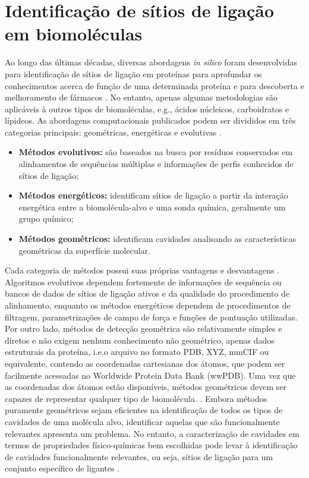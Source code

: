 \documentclass[Portugues]{phdquali}
\def\ie{i.e.\onedot}
\def\eg{e.g.\onedot}
\begin{document}
\section{Identificação de sítios de ligação em biomoléculas \label{sec:binding-sites}}

Ao longo das últimas décadas, diversas abordagens \textit{in silico} foram desenvolvidas para identificação de sítios de ligação em proteínas para aprofundar os conhecimentos acerca de função de uma determinada proteína e para descoberta e melhoramento de fármacos \cite{liang1998}. No entanto, apenas algumas metodologias são aplicáveis à outros tipos de biomoléculas, \eg, ácidos núcleicos, carboidratos e lípideos. As abordagens computacionais publicados podem ser divididos em três categorias principais: geométricas, energéticas e evolutivas \cite{oliveira2014,simoes2017}.

\begin{itemize}
  \item \textbf{Métodos evolutivos:} são baseados na busca por resíduos conservados em alinhamentos de sequências múltiplas e informações de perfis conhecidos de sítios de ligação;
  \item \textbf{Métodos energéticos:} identificam sítios de ligação a partir da interação energética entre a biomolécula-alvo e uma sonda química, geralmente um grupo químico;
  \item \textbf{Métodos geométricos:} identificam cavidades analisando as características geométricas da superfície molecular.
\end{itemize}

Cada categoria de métodos possui suas próprias vantagens e desvantagens \cite{sotriffer2002,henrich2010,simoes2017,krone2016}. Algoritmos evolutivos dependem fortemente de informações de sequência ou bancos de dados de sítios de ligação ativos e da qualidade do procedimento de alinhamento, enquanto os métodos energéticos dependem de procedimentos de filtragem, parametrizações de campo de força e funções de pontuação utilizadas. Por outro lado, métodos de detecção geométrica são relativamente simples e diretos e não exigem nenhum conhecimento não geométrico, apenas dados estruturais da proteína, \ie o arquivo no formato PDB, XYZ, mmCIF ou equivalente, contendo as coordenadas cartesianas dos átomos, que podem ser facilmente acessadas no Worldwide Protein Data Bank (wwPDB). Uma vez que as coordenadas dos átomos estão disponíveis, métodos geométricos devem ser capazes de representar qualquer tipo de biomolécula. \cite{henrich2010,oliveira2014,simoes2017}. Embora métodos puramente geométricos sejam eficientes na identificação de todos os tipos de cavidades de uma molécula alvo, identificar aquelas que são funcionalmente relevantes apresenta um problema. No entanto, a caracterização de cavidades em termos de propriedades físico-químicas bem escolhidas pode levar à identificação de cavidades funcionalmente relevantes, ou seja, sítios de ligação para um conjunto específico de ligantes \cite{sotriffer2002,henrich2010,simoes2017,liang1998}.
\end{document}
